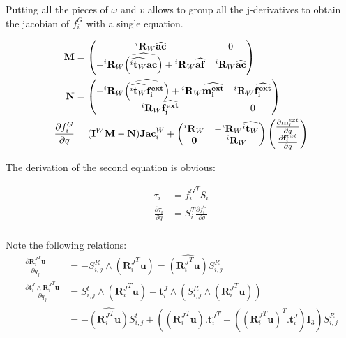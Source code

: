 Putting all the pieces of $\omega$ and $v$ allows to group all the j-derivatives to obtain the jacobian of $f^G_i$ with a single equation.

\begin{align}
  \bf M &=
  \begin{pmatrix}
    {}^i\mathbf{R}_W \widehat{\bf ac}  & 0\\
    -{{}^i\mathbf{R}_W}\widehat{\left(\widehat{{}^i\mathbf{t}_W}\bf ac \right)}
    + {}^i\mathbf{R}_W \widehat{\bf af}  & {{}^i\mathbf{R}_W}\widehat{\bf ac} \\
  \end{pmatrix}
  \\
  \bf N &=
  \begin{pmatrix}
    - {{}^i\mathbf{R}_W}\widehat{\left(\widehat{{}^i\mathbf{t}_W}\bf \mathbf{f}^{ext}_i \right)} + {}^i\mathbf{R}_W \widehat{\bf \mathbf{m}^{ext}_i} & {{}^i\mathbf{R}_W}\widehat{\bf \mathbf{f}^{ext}_i} \\
    {}^i\mathbf{R}_W \widehat{\bf \mathbf{f}^{ext}_i} & 0\\
  \end{pmatrix}
  \\
  \frac{\partial f^G_i}{\partial q} &= (\mathbf{I}^W \mathbf{M} - \mathbf{N})\mathbf{Jac}^W_i
  +
  \begin{pmatrix}
    {{}^i\mathbf{R}_W} & -{{}^i\mathbf{R}_W}\widehat{{}^i\mathbf{t}_W} \\
    \mathbf{0} & {{}^i\mathbf{R}_W} \\
  \end{pmatrix}
  \begin{pmatrix}
    \frac{\partial \mathbf{m}^{ext}_i}{\partial q} \\ \frac{\partial \mathbf{f}^{ext}_i}{\partial q}
  \end{pmatrix}
\end{align}

The derivation of the second equation is obvious:

\begin{align}
  \tau_i &= {f^G_i}^T S_i \\
  \frac{\partial \tau_i}{\partial q} &= S_i^T \frac{\partial f^G_i}{\partial q} \\
\end{align}

Note the following relations:
\begin{align}
  \frac{\partial {\mathbf{R}_i^J}^T \mathbf{u}}{\partial q_j}
  &= - S^R_{i,j} \wedge ({\mathbf{R}_i^J}^T \mathbf{u})
  = \widehat{({\mathbf{R}_i^J}^T \mathbf{u})} S^R_{i,j}
  \\
  \frac{\partial\mathbf{t}^J_i\wedge {\mathbf{R}_i^J}^T  \mathbf{u}}{\partial q_j}
  &= S^t_{i,j} \wedge \left({\mathbf{R}_i^J}^T \mathbf{u}\right)
  - \mathbf{t}^J_i \wedge \left( S^R_{i,j} \wedge \left({\mathbf{R}_i^J}^T \mathbf{u}\right)\right) \\
  &= -\widehat{({\mathbf{R}_i^J}^T \mathbf{u})} S^t_{i,j}
  + \left(\left({\mathbf{R}_i^J}^T \mathbf{u}\right) . {\mathbf{t}^J_i}^T
  - \left( ({\mathbf{R}_i^J}^T \mathbf{u})^T . \mathbf{t}^J_i\right) \mathbf{I}_3\right)S_{i,j}^R\\
\end{align}

